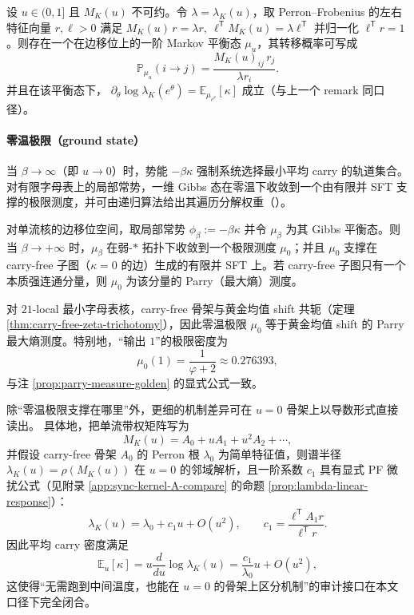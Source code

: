 \begin{proposition}\label{prop:kernel-equilibrium-pf}
设 $u\in(0,1]$ 且 $M_K(u)$ 不可约。令 $\lambda=\lambda_K(u)$，取 Perron--Frobenius 的左右特征向量 $r,\ell>0$ 满足
\(
M_K(u)\,r=\lambda r,\ \ell^{\mathsf T}M_K(u)=\lambda \ell^{\mathsf T}
\)
并归一化 $\ell^{\mathsf T}r=1$。则存在一个在边移位上的一阶 Markov 平衡态 $\mu_u$，其转移概率可写成
\[
\mathbb{P}_{\mu_u}(i\to j)=\frac{M_K(u)_{ij}\,r_j}{\lambda r_i}.
\]
并且在该平衡态下，
\(
\partial_\theta \log\lambda_K(e^\theta)=\mathbb{E}_{\mu_{e^\theta}}[\kappa]
\)
成立（与上一个 remark 同口径）。
\end{proposition}

\paragraph{零温极限（ground state）}
当 $\beta\to\infty$（即 $u\to 0$）时，势能 $-\beta\kappa$ 强制系统选择最小平均 carry 的轨道集合。对有限字母表上的局部常势，一维 Gibbs 态在零温下收敛到一个由有限并 SFT 支撑的极限测度，并可由递归算法给出其遍历分解权重（\cite{ChazottesGambaudoUgalde2011ZeroTempLocConst}）。

\begin{theorem}\label{thm:kernel-zero-temp}
对单流核的边移位空间，取局部常势 $\phi_\beta:=-\beta\kappa$ 并令 $\mu_\beta$ 为其 Gibbs 平衡态。则当 $\beta\to+\infty$ 时，$\mu_\beta$ 在弱-$\ast$ 拓扑下收敛到一个极限测度 $\mu_0$；并且 $\mu_0$ 支撑在 carry-free 子图（$\kappa=0$ 的边）生成的有限并 SFT 上。若 carry-free 子图只有一个本质强连通分量，则 $\mu_0$ 为该分量的 Parry（最大熵）测度。
\end{theorem}

\begin{corollary}\label{cor:kernel-21-ground-state}
对 $21$-local 最小字母表核，carry-free 骨架与黄金均值 shift 共轭（定理 \ref{thm:carry-free-zeta-trichotomy}），因此零温极限 $\mu_0$ 等于黄金均值 shift 的 Parry 最大熵测度。特别地，“输出 $1$”的极限密度为
\[
\mu_0(1)=\frac{1}{\varphi+2}\approx 0.276393,
\]
与注 \ref{prop:parry-measure-golden} 的显式公式一致。
\end{corollary}

\begin{remark}[零温谱的“可微指纹”：从 \texorpdfstring{$u=0$}{u=0} 骨架读出一阶响应]\label{rem:kernel-zero-temp-differential-fingerprint}
除“零温极限支撑在哪里”外，更细的机制差异可在 \(u=0\) 骨架上以导数形式直接读出。
具体地，把单流带权矩阵写为
$$
M_K(u)=A_0+uA_1+u^2A_2+\cdots,
$$
并假设 carry-free 骨架 \(A_0\) 的 Perron 根 \(\lambda_0\) 为简单特征值，则谱半径 \(\lambda_K(u)=\rho(M_K(u))\) 在 \(u=0\) 的邻域解析，且一阶系数 \(c_1\) 具有显式 PF 微扰公式（见附录 \ref{app:sync-kernel-A-compare} 的命题 \ref{prop:lambda-linear-response}）：
$$
\lambda_K(u)=\lambda_0+c_1u+O(u^2),
\qquad
c_1=\frac{\ell^{\mathsf T}A_1 r}{\ell^{\mathsf T}r}.
$$
因此平均 carry 密度满足
$$
\mathbb{E}_u[\kappa]
=u\frac{d}{du}\log\lambda_K(u)
=\frac{c_1}{\lambda_0}u+O(u^2),
$$
这使得“无需跑到中间温度，也能在 \(u=0\) 的骨架上区分机制”的审计接口在本文口径下完全闭合。
\end{remark}

